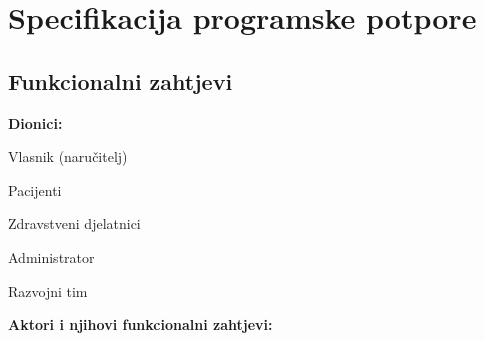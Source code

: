 \chapter{Specifikacija programske potpore}
		
	\section{Funkcionalni zahtjevi}
			
	    	\noindent \textbf{Dionici:}
			
			\begin{packed_enum}
				
				\item Vlasnik (naručitelj)
				\item Pacijenti
				\item Zdravstveni djelatnici			
				\item Administrator
				\item Razvojni tim
				
			\end{packed_enum}
			
			
			\noindent \textbf{Aktori i njihovi funkcionalni zahtjevi:}
			
